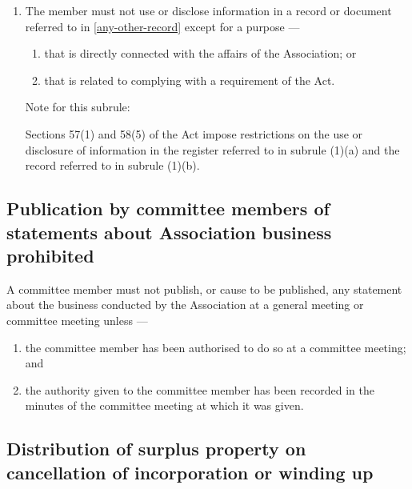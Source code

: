 \documentclass[../constitution.tex]{subfiles}
\begin{document}
\begin{enumerate}
\item The member must not use or disclose information in a record or document referred to in  \ref{any-other-record} except for a purpose ---

  \begin{enumerate}
  
  \item that is directly connected with the affairs of the Association; or
  \item that is related to complying with a requirement of the Act.
  \end{enumerate}


  Note for this subrule: 

  Sections 57(1) and 58(5) of the Act impose restrictions on the use or  disclosure of information in the register referred to in subrule (1)(a) and  the record referred to in subrule (1)(b). 

\end{enumerate}

\hypertarget{publication-by-committee-members-of-statements-about-association-business-prohibited}{%
\subsection{Publication by committee members of statements about Association business prohibited}\label{publication-by-committee-members-of-statements-about-association-business-prohibited}}

A committee member must not publish, or cause to be published, any statement about the business conducted by the Association at a general meeting or committee meeting unless ---

  \begin{enumerate}
  
  \item the committee member has been authorised to do so at a committee meeting; and
  \item the authority given to the committee member has been recorded in the minutes of the committee meeting at which it was given.
  \end{enumerate}


\hypertarget{distribution-of-surplus-property-on-cancellation-of-incorporation-or-winding-up}{%
\subsection{Distribution of surplus property on cancellation of incorporation or winding up}\label{distribution-of-surplus-property-on-cancellation-of-incorporation-or-winding-up}}
\end{document}
